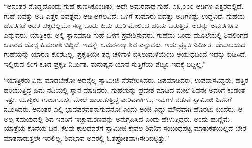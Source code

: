  “ಅನಂತರ ದೊಡ್ಡದೊಂದು ಗುಹೆ ಕಾಣಿಸಿಕೊಂಡಿತು. ಅದೇ ಅಮರನಾಥ ಗುಹೆ. ೧೩,೦೦೦ ಅಡಿಗಳ ಎತ್ತರದಲ್ಲಿದೆ. ಗುಹೆ ಐವತ್ತು ಅಡಿ ಎತ್ತರ ಐವತ್ತೈದು ಅಡಿ ಅಗಲವಿದೆ. ಒಳಗೆ ಸುಮಾರು ಐವತ್ತು ಅಡಿಗಳಷ್ಟು ಉದ್ದವಿದೆ. ಗುಹೆಯ ಹೊರಗಡೆ ಅದರ ಪಕ್ಕದಲ್ಲಿಯೇ ಸಣ್ಣ ಒಂದು ಹಿಮ ಝರಿ ಮೇಲಿಂದ ಹರಿದು ಬರುತ್ತಿದೆ. ಅದನ್ನು ಅಮರಗಂಗಾ ಎನ್ನುವರು. ಯಾತ್ರಿಕರು ಅಲ್ಲಿ ಸ್ನಾನಮಾಡಿ ಗುಹೆ ಒಳಗೆ ಪ್ರವೇಶಿಸುವರು. ಗುಹೆಯ ಒಂದು ಮೂಲೆಯಲ್ಲಿ ಶಿವಲಿಂಗದ ಆಕಾರದ ದೊಡ್ಡ ಹಿಮರಾಶಿ ಬಿದ್ದಿದೆ. ಇದನ್ನೇ ಅಮರನಾಥ ಶಿವ ಎನ್ನುವರು. ಇದು ಪ್ರಕೃತಿ ನಿರ್ಮಿತ. ದೇವಾಲಯದ ಗುಹೆಯನ್ನು ಯಾರೂ ಕೊರೆದಿಲ್ಲ. ಪ್ರಕೃತಿಯೇ ತನ್ನ ಚಳಿಗಾಳಿ ಬಿಸಿಲುಮಳೆಯೆಂಬ ಆಯುಧದಿಂದ ಇದನ್ನು ಬಿಡಿಸಿದೆ. ಇಲ್ಲಿರುವ ಲಿಂಗ ಕೂಡ ಪ್ರಕೃತಿ ನಿರ್ಮಿತ. ಮನುಷ್ಯನ ಯಾವ ಸುತ್ತಿಗೆಯ ಪೆಟ್ಟೂ ಇದಕ್ಕೆ ಬಿದ್ದಿಲ್ಲ.” 

 “ಯಾತ್ರಿಕರು ಏನು ಮಾಡಬೇಕೋ ಅದನ್ನೆಲ್ಲ ಸ್ವಾಮೀಜಿ ನೆರವೇರಿಸಿದರು. ಜಪಮಾಡಿದರು, ಉಪವಾಸವಿದ್ದರು, ಹತ್ತಿರ ಹರಿಯುತ್ತಿದ್ದ ಹಿಮ ನದಿಯಲ್ಲಿ ಸ್ನಾನ ಮಾಡಿದರು. ಗುಹೆಯನ್ನು ಪ್ರವೇಶ ಮಾಡಿದ ಮೇಲೆ ಶಿವನೇ ಅವರಿಗೆ ಕಂಡಂತೆ ಇತ್ತು. ಯಾತ್ರಿಕರ ಗುಜುಗುಂಪು, ಮೇಲೆ ಹಾರಾಡುತ್ತಿದ್ದ ಪಾರಿವಾಳಗಳು, ಇವುಗಳ ನಡುವೆ ಸ್ವಾಮೀಜಿ ಶಿವನಿಗೆ ನಮಿಸಿದರು. ಅನಂತರ ಎಲ್ಲಿ ಭಾವಪರವಶನಾಗುವೆನೋ ಎಂದು ಅಂಜಿ ಎದ್ದು ಮೌನವಾಗಿ ಹೊರಟು ಬಂದರು. ಆ ಅಲ್ಪ ಸಮಯದಲ್ಲಿ ಶಿವ ಇವರಿಗೆ ಇಚ್ಛಾಮರಣವನ್ನು ಅನುಗ್ರಹಿಸಿದ ಎಂದು ಹೇಳುತ್ತಿದ್ದರು. ಅಂದು ಹುಣ್ಣಿಮೆ. ಯಾತ್ರೆಯ ಕೊನೆಯ ದಿನ. ಕೆಲವು ಕಾಲದವರೆಗೆ ಸ್ವಾಮೀಜಿ ಕೇವಲ ಶಿವನಿಗೆ ಸಂಬಂಧಪಟ್ಟ ಮಾತುಕತೆಯಲ್ಲದೆ ಬೇರೆ ಮಾತನಾಡುತ್ತಲೇ ಇರಲಿಲ್ಲ, ಶಿವಭಾವ ಅವರಲ್ಲಿ ಓತಪ್ರೋತವಾಗಿಸೇರಿಬಿಟ್ಟಿತ್ತು.” 

